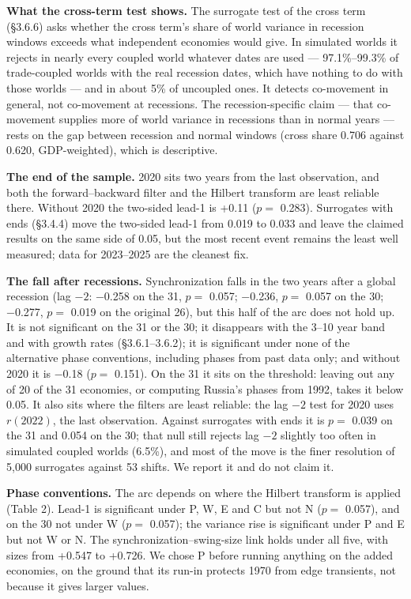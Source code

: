 \documentclass[11pt,a4paper]{article}
\newcounter{none}                    %
\begin{document}
\textbf{What the cross-term test shows.} The surrogate test of the cross term (§3.6.6) asks whether the cross term's share of world variance in recession windows exceeds what independent economies would give. In simulated worlds it rejects in nearly every coupled world whatever dates are used — 97.1\%–99.3\% of trade-coupled worlds with the real recession dates, which have nothing to do with those worlds — and in about 5\% of uncoupled ones. It detects co-movement in general, not co-movement at recessions. The recession-specific claim — that co-movement supplies more of world variance in recessions than in normal years — rests on the gap between recession and normal windows (cross share 0.706 against 0.620, GDP-weighted), which is descriptive.

\textbf{The end of the sample.} 2020 sits two years from the last observation, and both the forward–backward filter and the Hilbert transform are least reliable there. Without 2020 the two-sided lead-1 is +0.11 (\(p =\) 0.283). Surrogates with ends (§3.4.4) move the two-sided lead-1 from 0.019 to 0.033 and leave the claimed results on the same side of 0.05, but the most recent event remains the least well measured; data for 2023–2025 are the cleanest fix.

\textbf{The fall after recessions.} Synchronization falls in the two years after a global recession (lag \(-2\): −0.258 on the 31, \(p =\) 0.057; −0.236, \(p =\) 0.057 on the 30; −0.277, \(p =\) 0.019 on the original 26), but this half of the arc does not hold up. It is not significant on the 31 or the 30; it disappears with the 3–10 year band and with growth rates (§3.6.1–3.6.2); it is significant under none of the alternative phase conventions, including phases from past data only; and without 2020 it is −0.18 (\(p =\) 0.151). On the 31 it sits on the threshold: leaving out any of 20 of the 31 economies, or computing Russia's phases from 1992, takes it below 0.05. It also sits where the filters are least reliable: the lag \(-2\) test for 2020 uses \(r(2022)\), the last observation. Against surrogates with ends it is \(p =\) 0.039 on the 31 and 0.054 on the 30; that null still rejects lag \(-2\) slightly too often in simulated coupled worlds (6.5\%), and most of the move is the finer resolution of 5,000 surrogates against 53 shifts. We report it and do not claim it.

\textbf{Phase conventions.} The arc depends on where the Hilbert transform is applied (Table 2). Lead-1 is significant under P, W, E and C but not N (\(p =\) 0.057), and on the 30 not under W (\(p =\) 0.057); the variance rise is significant under P and E but not W or N. The synchronization–swing-size link holds under all five, with sizes from +0.547 to +0.726. We chose P before running anything on the added economies, on the ground that its run-in protects 1970 from edge transients, not because it gives larger values.
\end{document}
